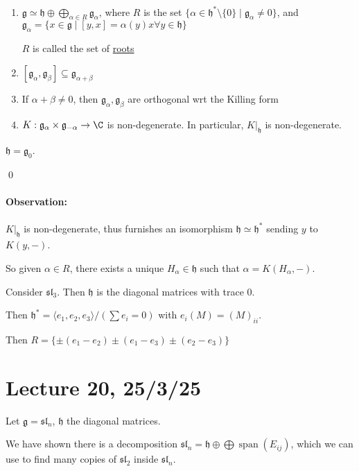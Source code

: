 \documentclass[x11names,reqno,14pt]{extarticle}
\newcommand{\mk}[1]{\mathfrak{#1}}
\newcommand{\g}{\mk{g}}
\newcommand{\h}{\mk{h}}
\renewcommand{\sl}{\mk{s}\mk{l}}
\DeclareMathOperator{\Span}{span}
\begin{document}
\thm
\,
\begin{enumerate}

\item $\g \simeq \h \oplus \bigoplus_{\alpha\in R}\g_\alpha$, where $R$ is the set $\{\alpha \in \mk{h}^*\setminus\{0\}\mid \g_\alpha\neq0\}$, and $\g_\alpha = \{x\in \g \mid [y, x] = \alpha(y)x\forall y \in \h\}$ 

$R$ is called the set of \underline{roots}

\item $[\g_\alpha,\g_\beta] \subseteq \g_{\alpha+\beta}$

\item If $\alpha+\beta\neq 0$, then $\g_\alpha,\g_\beta$ are orthogonal wrt the Killing form

\item $K:\g_\alpha\times\g_{-\alpha}\to\C$ is non-degenerate. In particular, $K|_{\h}$ is non-degenerate.

\end{enumerate}

\proof

$\h = \g_0$. 

\qed

\paragraph{Observation:} $K|_{\h}$ is non-degenerate, thus furnishes an isomorphism $\h\simeq\h^*$ sending $y$ to $K(y,-)$.

So given $\alpha \in R$, there exists a unique $H_\alpha \in \h$ such that $\alpha = K(H_\alpha,-)$. 

\exm

Consider $\sl_3$. Then $\h$ is the diagonal matrices with trace 0.

Then $\h^* = \langle e_1, e_2, e_3\rangle/(\sum e_i = 0)$ with $e_i(M) = (M)_{ii}$. 

Then $R = \{\pm(e_1 - e_2) \pm (e_1 - e_3) \pm (e_2 - e_3)\}$

\section*{Lecture 20, 25/3/25}

\exm

Let $\g = \sl_n$, $\h$ the diagonal matrices. 

We have shown there is a decomposition $\sl_n = \h\oplus \bigoplus \Span(E_{ij})$, which we can use to find many copies of $\sl_2$ inside $\sl_n$. 
\end{document}
